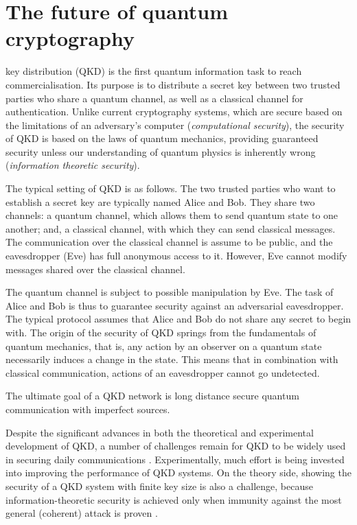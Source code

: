 \section{The future of quantum cryptography}\label{sec:essay_future_QKD}
 
 key distribution (QKD) is the first quantum information task to reach commercialisation. Its purpose is to distribute a secret key between two trusted parties who share a quantum channel, as well as a classical channel for authentication. Unlike current cryptography systems, which are secure based on the limitations of an adversary's computer (\textit{computational security}), the security of QKD is based on the laws of quantum mechanics, providing guaranteed security unless our understanding of quantum physics is inherently wrong (\textit{information theoretic security}).

The typical setting of QKD is as follows. The two trusted parties who want to establish a secret key are typically named Alice and Bob. They share two channels: a quantum channel, which allows them to send quantum state to one another; and, a classical channel, with which they can send classical messages. The communication over the classical channel is assume to be public, and the eavesdropper (Eve) has full anonymous access to it. However, Eve cannot modify messages shared over the classical channel.

The quantum channel is subject to possible manipulation by Eve. The task of Alice and Bob is thus to guarantee security against an adversarial eavesdropper. The typical protocol assumes that Alice and Bob do not share any secret to begin with. The origin of the security of QKD springs from the fundamentals of quantum mechanics, that is, any action by an observer on a quantum state necessarily induces a change in the state. This means that in combination with classical communication, actions of an eavesdropper cannot go undetected.

The ultimate goal of a QKD network is long distance secure quantum communication with imperfect sources.

Despite the significant advances in both the theoretical and experimental development of QKD, a number of challenges remain for QKD to be widely used in securing daily communications \cite{bib:RevModPhys.81.1301, bib:diamanti2016practical}. Experimentally, much effort is being invested into improving the performance of QKD systems. On the theory side,  showing the security of a QKD system with finite key size is also a challenge, because information-theoretic security is achieved only when immunity against the most general (coherent) attack is proven \cite{bib:diamanti2016practical}.

